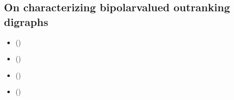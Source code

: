 \documentclass[a4paper,12pt,english]{sphinxhowto}
\begin{document}
\subsection{On characterizing bipolar\sphinxhyphen{}valued outranking digraphs}
\label{\detokenize{pearls:on-characterizing-bipolar-valued-outranking-digraphs}}\label{\detokenize{pearls:sufficiency-tutorial-label}}
\begin{sphinxcontents}
\begin{itemize}
\item {} 
\sphinxAtStartPar
{}\label{\detokenize{pearls:id162}}{\hyperref[\detokenize{pearls:necessary-properties-of-the-outranking-digraph}]{}} ()

\item {} 
\sphinxAtStartPar
{}\label{\detokenize{pearls:id163}}{\hyperref[\detokenize{pearls:partial-tournaments-may-be-strict-outranking-digraphs}]{}} ()

\item {} 
\sphinxAtStartPar
{}\label{\detokenize{pearls:id164}}{\hyperref[\detokenize{pearls:recognizing-bipolar-outranking-valuations}]{}} ()

\item {} 
\sphinxAtStartPar
{}\label{\detokenize{pearls:id165}}{\hyperref[\detokenize{pearls:on-generating-random-outranking-valuations}]{}} ()

\end{itemize}
\end{sphinxcontents}
\end{document}
